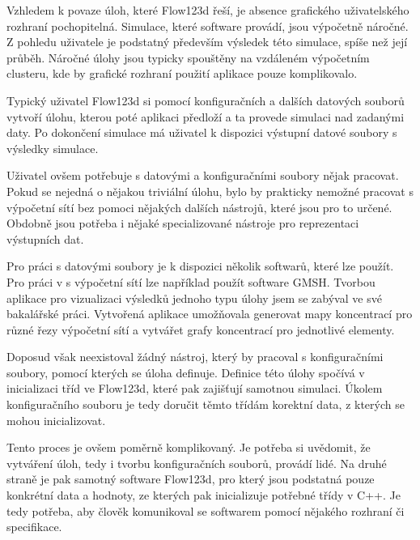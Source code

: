 \documentclass[FM,DP]{tulthesis}
\begin{document}
Vzhledem k povaze úloh, které Flow123d řeší, je absence grafického uživatelského rozhraní pochopitelná. Simulace, které software provádí, jsou výpočetně náročné. Z pohledu uživatele je podstatný především výsledek této simulace, spíše než její průběh. Náročné úlohy jsou typicky spouštěny na vzdáleném výpočetním clusteru, kde by grafické rozhraní použití aplikace pouze komplikovalo.

Typický uživatel Flow123d si pomocí konfiguračních a dalších datových souborů vytvoří úlohu, kterou poté aplikaci předloží a ta provede simulaci nad zadanými daty. Po dokončení simulace má uživatel k dispozici výstupní datové soubory s výsledky simulace.

Uživatel ovšem potřebuje s datovými a konfiguračními soubory nějak pracovat. Pokud se nejedná o nějakou triviální úlohu, bylo by prakticky nemožné pracovat s výpočetní sítí bez pomoci nějakých dalších nástrojů, které jsou pro to určené. Obdobně jsou potřeba i nějaké specializované nástroje pro reprezentaci výstupních dat.


Pro práci s datovými soubory je k dispozici několik softwarů, které lze použít. Pro práci v s výpočetní sítí lze například použít software GMSH. Tvorbou aplikace pro vizualizaci výsledků jednoho typu úlohy jsem se zabýval ve své bakalářské práci. Vytvořená aplikace umožňovala generovat mapy koncentrací pro různé řezy výpočetní sítí a vytvářet grafy koncentrací pro jednotlivé elementy.

Doposud však neexistoval žádný nástroj, který by pracoval s konfiguračními soubory, pomocí kterých se úloha definuje. Definice této úlohy spočívá v inicializaci tříd ve Flow123d, které pak zajišťují samotnou simulaci. Úkolem konfiguračního souboru je tedy doručit těmto třídám korektní data, z kterých se mohou inicializovat.

Tento proces je ovšem poměrně komplikovaný. Je potřeba si uvědomit, že vytváření úloh, tedy i tvorbu konfiguračních souborů, provádí lidé. Na druhé straně je pak samotný software Flow123d, pro který jsou podstatná pouze konkrétní data a hodnoty, ze kterých pak inicializuje potřebné třídy v C++. Je tedy potřeba, aby člověk komunikoval se softwarem pomocí nějakého rozhraní či specifikace.
\end{document}

